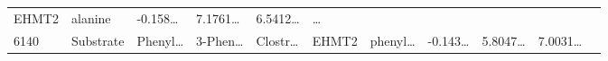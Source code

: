 \documentclass[
]{article}
\begin{document}
\begin{longtable}[]{@{}lllllllllll@{}}
\begin{minipage}[t]{0.07\columnwidth}
EHMT2\strut
\end{minipage} & \begin{minipage}[t]{0.09\columnwidth}\raggedright
alanine\strut
\end{minipage} & \begin{minipage}[t]{0.07\columnwidth}\raggedright
-0.158\ldots{}\strut
\end{minipage} & \begin{minipage}[t]{0.07\columnwidth}\raggedright
7.1761\ldots{}\strut
\end{minipage} & \begin{minipage}[t]{0.07\columnwidth}\raggedright
6.5412\ldots{}\strut
\end{minipage} & \begin{minipage}[t]{0.03\columnwidth}\raggedright
\ldots{}\strut
\end{minipage}\tabularnewline
\begin{minipage}[t]{0.05\columnwidth}\raggedright
6140\strut
\end{minipage} & \begin{minipage}[t]{0.07\columnwidth}\raggedright
Substrate\strut
\end{minipage} & \begin{minipage}[t]{0.07\columnwidth}\raggedright
Phenyl\ldots{}\strut
\end{minipage} & \begin{minipage}[t]{0.09\columnwidth}\raggedright
3-Phen\ldots{}\strut
\end{minipage} & \begin{minipage}[t]{0.07\columnwidth}\raggedright
Clostr\ldots{}\strut
\end{minipage} & \begin{minipage}[t]{0.07\columnwidth}\raggedright
EHMT2\strut
\end{minipage} & \begin{minipage}[t]{0.09\columnwidth}\raggedright
phenyl\ldots{}\strut
\end{minipage} & \begin{minipage}[t]{0.07\columnwidth}\raggedright
-0.143\ldots{}\strut
\end{minipage} & \begin{minipage}[t]{0.07\columnwidth}\raggedright
5.8047\ldots{}\strut
\end{minipage} & \begin{minipage}[t]{0.07\columnwidth}\raggedright
7.0031\ldots{}\strut
\end{minipage} & \begin{minipage}[t]{0.03\columnwidth}\raggedright

\end{minipage}
\end{longtable}
\end{document}
